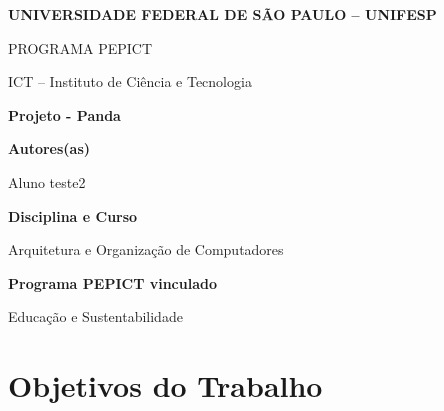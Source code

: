 \documentclass[12pt,a4paper]{article}
\begin{document}

\begin{center}

{\large \textbf{UNIVERSIDADE FEDERAL DE SÃO PAULO -- UNIFESP}}

\vspace{0.3cm}

{\normalsize PROGRAMA PEPICT}

\vspace{0.3cm}

{\normalsize ICT -- Instituto de Ciência e Tecnologia}

\vspace{1cm}

{\Large \textbf{Projeto - Panda}}

\end{center}

\vspace{1cm}


\noindent
\textbf{Autores(as)}

Aluno teste2

\vspace{0.7cm}


\noindent
\textbf{Disciplina e Curso}

Arquitetura e Organização de Computadores

\vspace{0.7cm}


\noindent
\textbf{Programa PEPICT vinculado}

Educação e Sustentabilidade

\vspace{0.7cm}


\section*{Objetivos do Trabalho}
\end{document}
